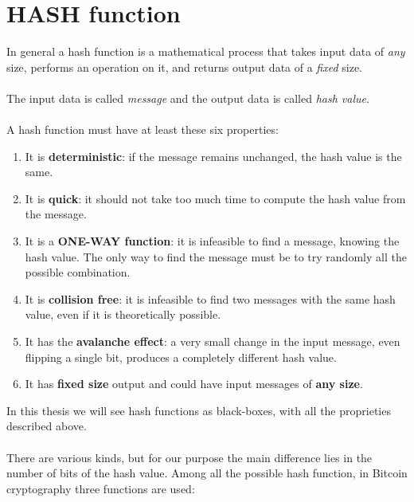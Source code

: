 \section{HASH function}
In general a hash function is a mathematical process that takes input data of \textit{any} size, performs an operation on it, and returns output data of a \textit{fixed} size.
\\ \\
The input data is called \textit{message} and the output data is called \textit{hash value}. 
\\ \\
A hash function must have at least these six properties:
\begin{enumerate}[label=(\roman*)]
	\item It is \textbf{deterministic}: if the message remains unchanged, the hash value is the same.
	\item It is \textbf{quick}: it should not take too much time to compute the hash value from the message.
	\item It is a \textbf{ONE-WAY function}: it is infeasible to find a message, knowing the hash value. The only way to find the message must be to try randomly all the possible combination.
	\item It is \textbf{collision free}: it is infeasible to find two messages with the same hash value, even if it is theoretically possible.
	\item It has the \textbf{avalanche effect}: a very small change in the input message, even flipping a single bit, produces a completely different hash value.
	\item It has \textbf{fixed size} output and could have input messages of \textbf{any size}.
\end{enumerate}
In this thesis we will see hash functions as black-boxes, with all the proprieties described above. 
\\ \\
There are various kinds, but for our purpose the main difference lies in the number of bits of the hash value. Among all the possible hash function, in Bitcoin cryptography three functions are used:
